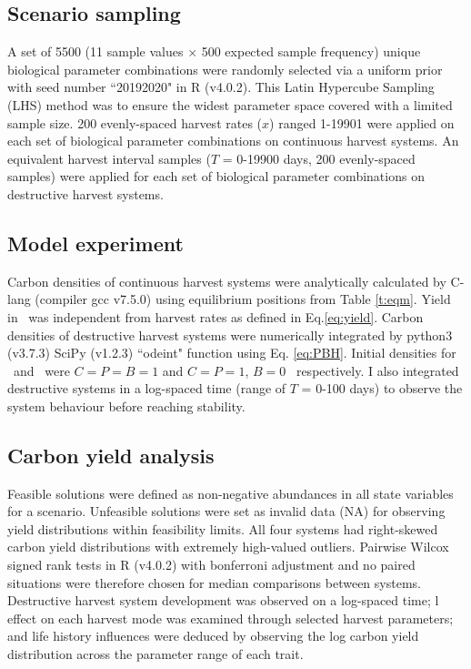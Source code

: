 \documentclass[env.tex]{subfiles}
\begin{document}
\subsection{Scenario sampling}
A set of 5500 (11 sample values $\times$ 500 expected sample frequency) unique biological parameter combinations were randomly selected via a uniform prior with seed number ``20192020" in R (v4.0.2).  This Latin Hypercube Sampling (LHS) method was to ensure the widest parameter space covered with a limited sample size.  200 evenly-spaced harvest rates ($x$) ranged 1-19901 \dayU were applied on each set of biological parameter combinations on continuous harvest systems.  An equivalent harvest interval samples ($T$ = 0-19900 days, 200 evenly-spaced samples) were applied for each set of biological parameter combinations on destructive harvest systems.

\subsection{Model experiment}
Carbon densities of continuous harvest systems were analytically calculated by C-lang (compiler gcc v7.5.0) using equilibrium positions from Table \ref{t:eqm}. Yield in \PoH\ was independent from harvest rates as defined in Eq.\ref{eq:yield}.  Carbon densities of destructive harvest systems were numerically integrated by python3 (v3.7.3) SciPy (v1.2.3) ``odeint" function using Eq. \ref{eq:PBH}.  Initial densities for \PBN\ and \PoN\ were $C=P=B=1$ and $C=P=1$, $B=0$ \den\ respectively.  I also integrated destructive systems in a log-spaced time (range of $T$ = 0-100 days) to observe the system behaviour before reaching stability.

\subsection{Carbon yield analysis}
Feasible solutions were defined as non-negative abundances in all state variables for a scenario.  Unfeasible solutions were set as invalid data (NA) for observing yield distributions within feasibility limits.  All four systems had right-skewed carbon yield distributions with extremely high-valued outliers.  Pairwise Wilcox signed rank tests in R (v4.0.2) with bonferroni adjustment and no paired situations were therefore chosen for median comparisons between systems.  Destructive harvest system development was observed on a log-spaced time; \bac l effect on each harvest mode was examined through selected harvest parameters; and life history influences were deduced by observing the log carbon yield distribution across the parameter range of each trait.
\end{document}
